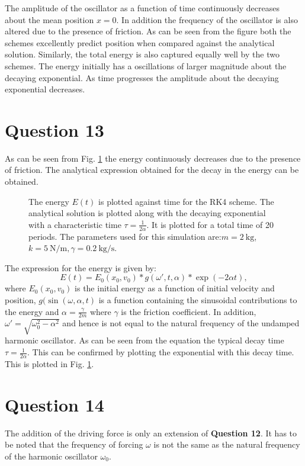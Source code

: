 \documentclass[10pt]{article}
\begin{document}
The amplitude of the oscillator as a function of time continuously decreases about the mean position $x=0$. In addition the frequency of the oscillator is also altered due to the presence of friction. 
As can be seen from the figure both the schemes excellently predict position when compared against the analytical solution. Similarly, the total energy is also captured equally well by the two schemes. The energy initially has a oscillations of larger magnitude about the decaying exponential. As time progresses the amplitude about the decaying exponential decreases. 

\section*{Question 13}
As can be seen from Fig. \ref{fig:energy_interpretation} the energy continuously decreases due to the presence of friction. The analytical expression obtained for the decay in the energy can be obtained. 

\begin{figure}[!htb]
\centering

\caption{The energy $E(t)$ is plotted against time for the RK4 scheme. The analytical solution is plotted along with the decaying exponential with a characteristic time $\tau = \frac{1}{2\alpha}$. It is plotted for a total time of 20 periods. The parameters used for this simulation are:$m=2\ \mathrm{kg}$, $k=5\ \mathrm{N/m}, \gamma=0.2\ \mathrm{kg/s}$.}
\label{fig:energy_interpretation}
\end{figure} 

The expression for the energy is given by:
%
\begin{equation}
E(t) = E_{0}(x_{0}, v_{0})*g(\omega', t, \alpha)*\exp(-2\alpha t),
\end{equation}
%
where $E_{0}(x_{0}, v_{0})$ is the initial energy as a function of initial velocity and position, $g(\sin(\omega, \alpha, t)$ is a function containing the sinusoidal contributions to the energy and $\alpha = \frac{\gamma}{2m}$ where $\gamma$ is the friction coefficient. In addition, $\omega'=\sqrt{\omega_{0}^2 - \alpha^2}$ and hence is not equal to the natural frequency of the undamped harmonic oscillator. As can be seen from the equation the typical decay time $\tau = \frac{1}{2\alpha}$. This can be confirmed by plotting the exponential with this decay time. This is plotted in Fig. \ref{fig:energy_interpretation}. 

\section*{Question 14}
The addition of the driving force is only an extension of \textbf{Question 12}. It has to be noted that the frequency of forcing $\omega$ is not the same as the natural frequency of the harmonic oscillator $\omega_{0}$.
\end{document}
